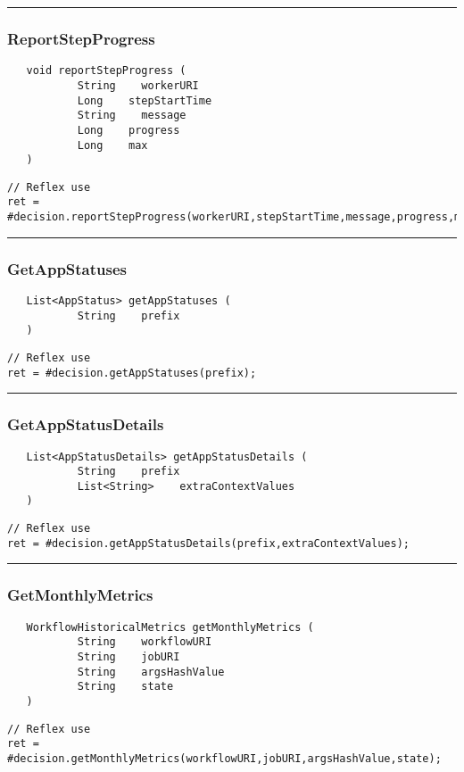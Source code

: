 \rule{15cm}{2pt}
\subsubsection{ReportStepProgress}
\label{Api:ReportStepProgress}
\begin{verbatim}
   void reportStepProgress (
           String    workerURI
           Long    stepStartTime
           String    message
           Long    progress
           Long    max
   )
\end{verbatim}
\begin{lstlisting}[language=reflex]
// Reflex use
ret = #decision.reportStepProgress(workerURI,stepStartTime,message,progress,max);
\end{lstlisting}



\rule{15cm}{2pt}
\subsubsection{GetAppStatuses}
\label{Api:GetAppStatuses}
\begin{verbatim}
   List<AppStatus> getAppStatuses (
           String    prefix
   )
\end{verbatim}
\begin{lstlisting}[language=reflex]
// Reflex use
ret = #decision.getAppStatuses(prefix);
\end{lstlisting}



\rule{15cm}{2pt}
\subsubsection{GetAppStatusDetails}
\label{Api:GetAppStatusDetails}
\begin{verbatim}
   List<AppStatusDetails> getAppStatusDetails (
           String    prefix
           List<String>    extraContextValues
   )
\end{verbatim}
\begin{lstlisting}[language=reflex]
// Reflex use
ret = #decision.getAppStatusDetails(prefix,extraContextValues);
\end{lstlisting}



\rule{15cm}{2pt}
\subsubsection{GetMonthlyMetrics}
\label{Api:GetMonthlyMetrics}
\begin{verbatim}
   WorkflowHistoricalMetrics getMonthlyMetrics (
           String    workflowURI
           String    jobURI
           String    argsHashValue
           String    state
   )
\end{verbatim}
\begin{lstlisting}[language=reflex]
// Reflex use
ret = #decision.getMonthlyMetrics(workflowURI,jobURI,argsHashValue,state);
\end{lstlisting}



